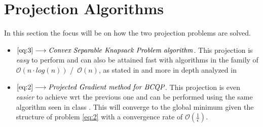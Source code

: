 \documentclass[12pt]{article}
\begin{document}
	\section{Projection Algorithms} \label{projections}
	In this section the focus will be on how the two projection problems are solved. \\
	\begin{itemize}
	    \item $\eqref{eq:3} \longrightarrow \emph{Convex Separable Knapsack Problem algorithm}$. This projection is \textit{easy} to perform and can also be attained fast with algorithms in the family of $\mathcal{O}(n\cdot log(n))$ /\ $\mathcal{O}(n)$, as stated in \parencite[see][Introduction]{cqknsp} and more in depth analyzed in \parencite[see][Algorithm 3.1 (convergence proved in Remark 3.2(d))]{Kiwiel2008}
	    \item $\eqref{eq:2} \longrightarrow \emph{Projected Gradient method for BCQP}$. This projection is even \textit{easier} to achieve wrt the previous one and can be performed using the same algorithm seen in class \parencite[see][Slide 13]{slideproj}. This will converge to the global minimum given the structure of problem \eqref{eq:2} with a convergence rate of $\mathcal{O}(\frac{1}{\epsilon})$.\\
	\end{itemize}
\end{document}
